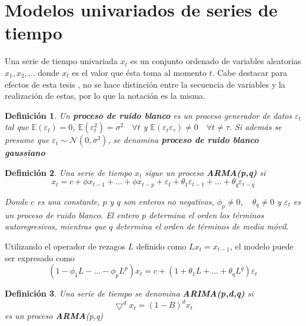 \documentclass[12pt, twoside]{book}\usepackage[]{graphicx}\usepackage[]{color}
\numberwithin{equation}{section}
\numberwithin{theorem}{section}
\numberwithin{teorema}{section}
\newtheorem{defi}{Definición}
\newenvironment{defin}
      {\begin{shaded}\begin{defi}}
      {\end{defi}\end{shaded}}
\numberwithin{defi}{section}
\numberwithin{prop}{section}
\numberwithin{defi}{section}
\theoremstyle{plain}
\begin{document}
\section{Modelos univariados de series de tiempo}

Una serie de tiempo univariada $x_{t}$ es un conjunto ordenado de variables aleatorias $x_{1},x_{2},...$ donde $x_{t}$ es el valor que ésta toma al momento $t$. Cabe destacar para efectos de esta tesis , no se hace distinción entre la secuencia de variables y la realización de estas, por lo que la notación es la misma. 


\begin{defin}
Un \textbf{proceso de ruido blanco} es un proceso generador de datos $\varepsilon_{t}$ tal que $\mathbb{E}(\varepsilon_{t})=0$, $\mathbb{E}(\varepsilon_{t}^{2})=\sigma^{2}\quad \forall t$ y $\mathbb{E}(\varepsilon_{t}\varepsilon_{\tau})\neq 0\quad \forall t\neq \tau$. Si además se presume que $\varepsilon_{t}\sim \mathcal{N}(0,\sigma^{2})$, se denomina \textbf{proceso de ruido blanco gaussiano}
\end{defin}

\begin{defin}
Una serie de tiempo $x_{t}$ sigue un proceso \textbf{ARMA(p,q)} si 
\begin{equation}
x_{t}  = c +\phi x_{t-1}+...+\phi x_{t-p}+\varepsilon_{t}+\theta_{1}\varepsilon_{t-1}+...+\theta_{q}\varepsilon_{t-q}
\end{equation}

Donde $c$ es una constante, $p$ y $q$ son enteros no negativos, $\phi_{p}\neq 0,\quad \theta_{q}\neq 0$ y $\varepsilon_{t}$ es un proceso de ruido blanco. El entero $p$ determina el orden los términos autoregresivos, mientras que $q$ determina el orden de términos de media móvil.   

\end{defin}

Utilizando el operador de rezagos $L$ definido como $Lx_{t}=x_{t-1}$, el modelo puede ser expresado como 
\begin{equation}
(1-\phi_{1}L-...-\phi_{p}L^{p})x_{t} = c+(1+\theta_{1}L+...+\theta_{q}L^{q})\varepsilon_{t}
\end{equation}

\begin{defin}
Una serie de tiempo se denomina \textbf{ARIMA(p,d,q)} si 
\begin{equation}
\bigtriangledown^{d}x_{t} = (1-B)^{d}x_{t} 
\end{equation}
es un proceso \textbf{ARMA}(p,q)
\end{defin}
\end{document}
